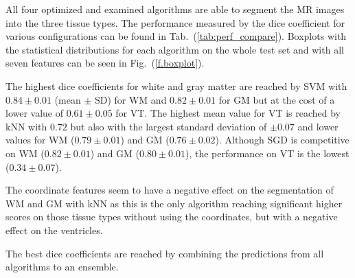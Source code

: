 \documentclass[journal]{IEEEtran}
\begin{document}
All four optimized and examined algorithms are able to segment the MR images into the three tissue types. The performance measured by the dice coefficient for various configurations can be found in Tab.~(\ref{tab:perf_compare}). Boxplots with the statistical distributions for each algorithm on the whole test set and with all seven features can be seen in Fig.~(\ref{f.boxplot}).

The highest dice coefficients for white and gray matter are reached by SVM with $0.84 \pm 0.01$ (mean $\pm$ SD) for WM and $0.82 \pm 0.01$ for GM but at the cost of a lower value of $0.61 \pm 0.05$ for VT. The highest mean value for VT is reached by kNN with $0.72$ but also with the largest standard deviation of $\pm 0.07$ and lower values for WM ($0.79 \pm 0.01$) and GM ($0.76 \pm 0.02$). Although SGD is competitive on WM ($0.82 \pm 0.01$) and GM ($0.80 \pm 0.01$), the performance on VT is the lowest ($0.34 \pm 0.07$).

The coordinate features seem to have a negative effect on the segmentation of WM and GM with kNN as this is the only algorithm reaching significant higher scores on those tissue types without using the coordinates, but with a negative effect on the ventricles.

The best dice coefficients are reached by combining the predictions from all algorithms to an ensemble.
\end{document}
